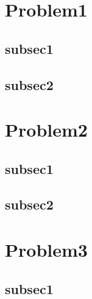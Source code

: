 \documentclass[UTF8]{ctexart}
\begin{document}
\section{Problem1}
\setcounter{equation}{0}

\subsection{subsec1}

\subsection{subsec2}

\bigskip

\clearpage
\section{Problem2}
\setcounter{equation}{0}

\subsection{subsec1}

\subsection{subsec2}

\bigskip

\clearpage
\section{Problem3}
\setcounter{equation}{0}

\subsection{subsec1}

\end{document}
